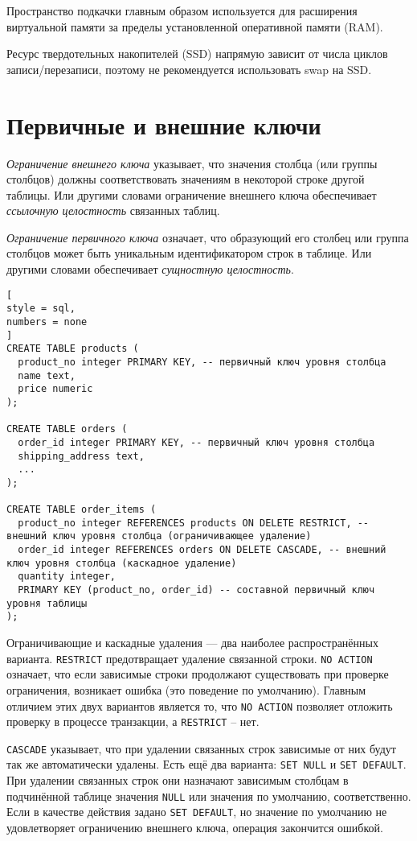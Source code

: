 \documentclass[%
	11pt,
	a4paper,
	utf8,
		]{article}
\begin{document}
Пространство подкачки главным образом используется для расширения виртуальной памяти за пределы установленной оперативной памяти (RAM).

Ресурс твердотельных накопителей (SSD) напрямую зависит от числа циклов записи/перезаписи, поэтому не рекомендуется использовать swap на SSD.

\section{Первичные и внешние ключи}

\emph{Ограничение внешнего ключа} указывает, что значения столбца (или группы столбцов) должны соответствовать значениям в некоторой строке другой таблицы. Или другими словами ограничение внешнего ключа обеспечивает \emph{ссылочную целостность} связанных таблиц.

\emph{Ограничение первичного ключа} означает, что образующий его столбец или группа столбцов может быть уникальным идентификатором строк в таблице. Или другими словами обеспечивает \emph{сущностную целостность}.

\begin{lstlisting}[
style = sql,
numbers = none	
]
CREATE TABLE products (
  product_no integer PRIMARY KEY, -- первичный ключ уровня столбца
  name text,
  price numeric
);

CREATE TABLE orders (
  order_id integer PRIMARY KEY, -- первичный ключ уровня столбца
  shipping_address text,
  ...
);

CREATE TABLE order_items (
  product_no integer REFERENCES products ON DELETE RESTRICT, -- внешний ключ уровня столбца (ограничивающее удаление)
  order_id integer REFERENCES orders ON DELETE CASCADE, -- внешний ключ уровня столбца (каскадное удаление)
  quantity integer,
  PRIMARY KEY (product_no, order_id) -- составной первичный ключ уровня таблицы
);
\end{lstlisting}

Ограничивающие и каскадные удаления — два наиболее распространённых варианта. \texttt{RESTRICT} предотвращает удаление связанной строки. \texttt{NO ACTION} означает, что если зависимые строки продолжают существовать при проверке ограничения, возникает ошибка (это поведение по умолчанию). Главным отличием этих двух вариантов является то, что \texttt{NO ACTION} позволяет отложить проверку в процессе транзакции, а \texttt{RESTRICT} -- нет.

\texttt{CASCADE} указывает, что при удалении связанных строк зависимые от них будут так же автоматически удалены. Есть ещё два варианта: \texttt{SET NULL} и \texttt{SET DEFAULT}. При удалении связанных строк они назначают зависимым столбцам в подчинённой таблице значения \texttt{NULL} или значения по умолчанию, соответственно. Если в качестве действия задано \texttt{SET DEFAULT}, но значение по умолчанию не удовлетворяет ограничению внешнего ключа, операция закончится ошибкой.
\end{document}
